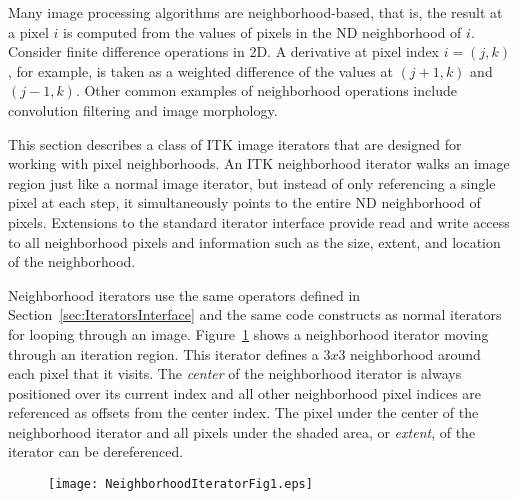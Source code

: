 Many image processing algorithms are neighborhood-based, that is, the result at
a pixel $i$ is computed from the values of pixels in the ND neighborhood of
$i$. Consider finite difference operations in 2D.  A derivative at pixel index
$i = (j, k)$, for example, is taken as a weighted difference of the values
at $(j+1, k)$ and $(j-1, k)$. Other common examples of neighborhood operations
include convolution filtering and image morphology.

This section describes a class of ITK image iterators that are designed for
working with pixel neighborhoods. An ITK neighborhood iterator walks an image
region just like a normal image iterator, but instead of only referencing a
single pixel at each step, it simultaneously points to the entire ND
neighborhood of pixels.  Extensions to the standard iterator interface provide
read and write access to all neighborhood pixels and information
such as the size, extent, and location of the neighborhood.

Neighborhood iterators use the same operators defined in
Section~\ref{sec:IteratorsInterface} and the same code constructs as normal
iterators for looping through an
image. Figure~\ref{fig:NeighborhoodIteratorFig1} shows a neighborhood iterator
moving through an iteration region.  This iterator defines a $3x3$ neighborhood
around each pixel that it visits. The \emph{center} of the neighborhood
iterator is always positioned over its current index and all other neighborhood
pixel indices are referenced as offsets from the center index.  The pixel
under the center of the neighborhood iterator and all pixels under the shaded
area, or \emph{extent}, of the iterator can be dereferenced.

\begin{figure}
\centering
\texttt{[image: NeighborhoodIteratorFig1.eps]}
\protect\label{fig:NeighborhoodIteratorFig1}
\end{figure}


